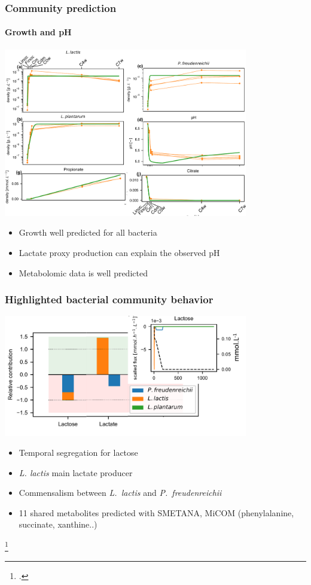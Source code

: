 \documentclass[8pt,usenames,dvipsnames]{beamer}
\def\freud{\textit{P.~freudenreichii}\xspace}
\def\lactis{\textit{L.~lactis}\xspace}
\begin{document}
\begin{frame}
\frametitle{Community prediction}
\framesubtitle{Growth and pH}
\centering
\includegraphics[width=0.8\textwidth]{figures/community-pred-growth.pdf}
\begin{block}{}
\begin{itemize}
\item Growth well predicted for all bacteria
\item Lactate proxy production can explain the observed pH
\item Metabolomic data is well predicted 
\end{itemize}
\end{block}
\end{frame}


\begin{frame}
\frametitle{Highlighted bacterial community behavior}
\centering
\includegraphics[width=0.8\textwidth]{figures/relative-contribution.pdf}
\begin{minipage}{0.5\textwidth}

\begin{itemize}
\item Temporal segregation for lactose
\item \textit{L. lactis} main lactate producer 
\item Commensalism between \lactis and \freud
\end{itemize}

\end{minipage}%
\begin{minipage}{0.5\textwidth}
\begin{itemize}
\item 11 shared metabolites predicted with SMETANA, MiCOM (phenylalanine, succinate, xanthine..)
\end{itemize}
\end{minipage}

\footcite{Zelezniak2015,diener2020}
\end{frame}
\end{document}
